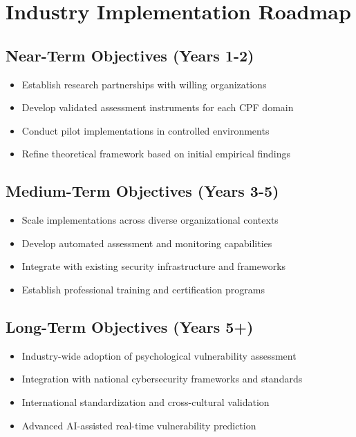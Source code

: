 \documentclass[11pt,a4paper]{article}
\begin{document}
\section{Industry Implementation Roadmap}

\subsection{Near-Term Objectives (Years 1-2)}

\begin{itemize}
\item Establish research partnerships with willing organizations
\item Develop validated assessment instruments for each CPF domain
\item Conduct pilot implementations in controlled environments
\item Refine theoretical framework based on initial empirical findings
\end{itemize}

\subsection{Medium-Term Objectives (Years 3-5)}

\begin{itemize}
\item Scale implementations across diverse organizational contexts
\item Develop automated assessment and monitoring capabilities
\item Integrate with existing security infrastructure and frameworks
\item Establish professional training and certification programs
\end{itemize}

\subsection{Long-Term Objectives (Years 5+)}

\begin{itemize}
\item Industry-wide adoption of psychological vulnerability assessment
\item Integration with national cybersecurity frameworks and standards
\item International standardization and cross-cultural validation
\item Advanced AI-assisted real-time vulnerability prediction
\end{itemize}
\end{document}
